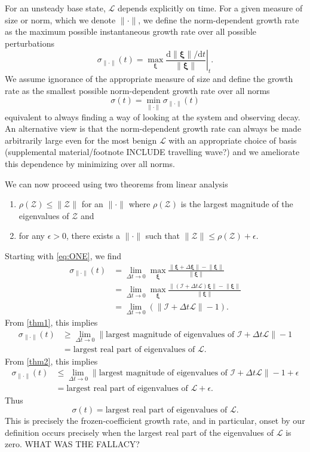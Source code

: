 \documentclass[letterpaper,prl,aps,reprint,superscriptaddress]{revtex4-1}
\newcommand{\cL}{\boldsymbol{\mathcal{L}}}
\newcommand{\cZ}{\boldsymbol{\mathcal{Z}}}
\newcommand{\cI}{\boldsymbol{\mathcal{I}}}
\newcommand{\prt}{\boldsymbol{\xi}}
\newcommand{\norm}[1]{{\|#1\|}}
\begin{document}
For an unsteady base state, $\cL$ depends explicitly on time.  For a given measure of size or norm, which we denote $\norm{\cdot}$, we define the norm-dependent growth rate as the maximum possible instantaneous growth rate over all possible perturbations
\begin{equation} \label{eq:ONE}
\sigma_\norm{\cdot} (t) = \max_{\prt} \left. \frac{\text{d} \norm{\prt}/\text{d} t}{\norm{\prt}}\right|_t.
\end{equation}
We assume ignorance of the appropriate measure of size and define the growth rate as the smallest possible norm-dependent growth rate over all norms
\[
\sigma(t) = \min_\norm{\cdot} \sigma_\norm{\cdot}(t)
\]
equivalent to always finding a way of looking at the system and observing decay.  An alternative view is that the norm-dependent growth rate can always be made arbitrarily large even for the most benign $\cL$ with an appropriate choice of basis (supplemental material/footnote INCLUDE travelling wave?) and we ameliorate this dependence by minimizing over all norms.

We can now proceed using two theorems from linear analysis \cite{BS}
\begin{enumerate}
\item $\rho(\cZ) \le \norm{\cZ}$ for an $\norm{\cdot}$ where $\rho(\cZ)$ is the largest magnitude of the eigenvalues of $\cZ$ and \label{thm1}
\item for any $\epsilon>0$, there exists a $\norm{\cdot}$ such that $\norm{\cZ} \le \rho(\cZ) + \epsilon$. \label{thm2}
\end{enumerate}
Starting with \eqref{eq:ONE}, we find
\begin{align*}
\sigma_\norm{\cdot}(t) &= \lim_{\Delta t \to 0} \max_{\prt} \frac{\norm{\prt + \Delta \prt} - \norm{\prt}}{\norm{\prt}} \\
&= \lim_{\Delta t \to 0} \max_{\prt} \frac{\norm{(\cI + \Delta t \cL)\prt} - \norm{\prt}}{\norm{\prt}} \\
&= \lim_{\Delta t \to 0} \left( \norm{\cI + \Delta t \cL} - 1 \right).
\end{align*}
From \eqref{thm1}, this implies
\begin{align*}
\sigma_\norm{\cdot}(t) &\ge \lim_{\Delta t \to 0} \| \text{largest magnitude of eigenvalues of } \cI + \Delta t \cL\| - 1 \\
&= \text{largest real part of eigenvalues of } \cL.
\end{align*}
From \eqref{thm2}, this implies
\begin{align*}
\sigma_\norm{\cdot}(t) &\le \lim_{\Delta t \to 0} \| \text{largest magnitude of eigenvalues of } \cI + \Delta t \cL\| - 1 + \epsilon \\
&= \text{largest real part of eigenvalues of } \cL + \epsilon .
\end{align*}
Thus 
\[
\sigma(t) = \text{largest real part of eigenvalues of } \cL.
\]
This is precisely the frozen-coefficient growth rate, and in particular, onset by our definition occurs precisely when the largest real part of the eigenvalues of $\cL$ is zero.  WHAT WAS THE FALLACY?
\end{document}
